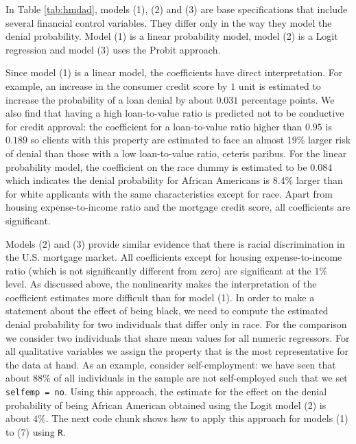 \documentclass[]{book}
\theoremstyle{definition}
\theoremstyle{definition}
\theoremstyle{definition}
\theoremstyle{remark}
\begin{document}
In Table \ref{tab:hmdad}, models (1), (2) and (3) are base
specifications that include several financial control variables. They
differ only in the way they model the denial probability. Model (1) is a
linear probability model, model (2) is a Logit regression and model (3)
uses the Probit approach.

Since model (1) is a linear model, the coefficients have direct
interpretation. For example, an increase in the consumer credit score by
\(1\) unit is estimated to increase the probability of a loan denial by
about \(0.031\) percentage points. We also find that having a high
loan-to-value ratio is predicted not to be conductive for credit
approval: the coefficient for a loan-to-value ratio higher than \(0.95\)
is \(0.189\) so clients with this property are estimated to face an
almost \(19\%\) larger risk of denial than those with a low
loan-to-value ratio, ceteris paribus. For the linear probability model,
the coefficient on the race dummy is estimated to be \(0.084\) which
indicates the denial probability for African Americans is \(8.4\%\)
larger than for white applicants with the same characteristics except
for race. Apart from housing expense-to-income ratio and the mortgage
credit score, all coefficients are significant.

Models (2) and (3) provide similar evidence that there is racial
discrimination in the U.S. mortgage market. All coefficients except for
housing expense-to-income ratio (which is not significantly different
from zero) are significant at the \(1\%\) level. As discussed above, the
nonlinearity makes the interpretation of the coefficient estimates more
difficult than for model (1). In order to make a statement about the
effect of being black, we need to compute the estimated denial
probability for two individuals that differ only in race. For the
comparison we consider two individuals that share mean values for all
numeric regressors. For all qualitative variables we assign the property
that is the most representative for the data at hand. As an example,
consider self-employment: we have seen that about \(88\%\) of all
individuals in the sample are not self-employed such that we set
\texttt{selfemp = no}. Using this approach, the estimate for the effect
on the denial probability of being African American obtained using the
Logit model (2) is about \(4\%\). The next code chunk shows how to apply
this approach for models (1) to (7) using \texttt{R}.
\end{document}
